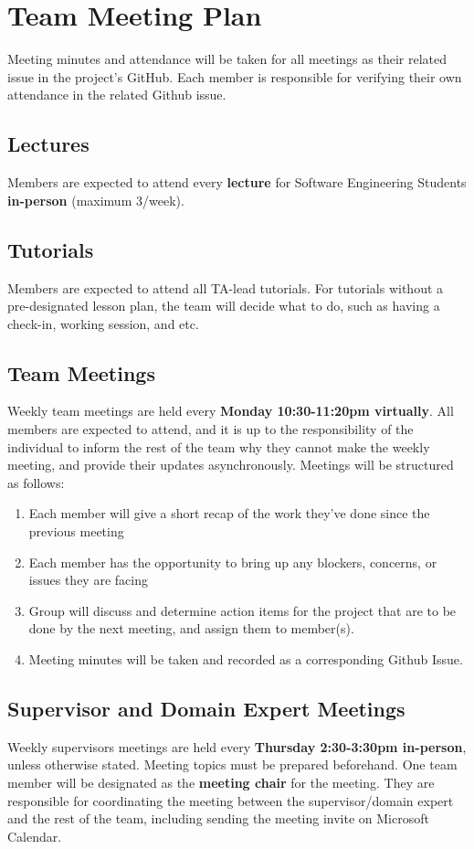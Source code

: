 \documentclass{article}
\begin{document}
\section{Team Meeting Plan}
Meeting minutes and attendance will be taken for all meetings as their related issue in the project's GitHub. Each member is responsible for verifying their own attendance in the related Github issue.
\subsection{Lectures}
  Members are expected to attend every \textbf{lecture} for Software Engineering Students \textbf{in-person} (maximum 3/week).
\subsection{Tutorials}
  Members are expected to attend all TA-lead tutorials. For tutorials without a pre-designated lesson plan, the team will decide what to do, such as having a check-in, working session, and etc.
\subsection{Team Meetings}
  Weekly team meetings are held every \textbf{Monday 10:30-11:20pm virtually}.
  All members are expected to attend, and it is up to the responsibility of the individual to inform the rest of the team why they cannot make the weekly meeting, and provide their updates asynchronously.
  Meetings will be structured as follows:
  \begin{enumerate}
    \item Each member will give a short recap of the work they've done since the previous meeting
    \item Each member has the opportunity to bring up any blockers, concerns, or issues they are facing
    \item Group will discuss and determine action items for the project that are to be done by the next meeting, and assign them to member(s).
    \item Meeting minutes will be taken and recorded as a corresponding Github Issue.
  \end{enumerate}
\subsection{Supervisor and Domain Expert Meetings}
  Weekly supervisors meetings are held every \textbf{Thursday 2:30-3:30pm in-person}, unless otherwise stated.
  Meeting topics must be prepared beforehand. One team member will be designated as the \textbf{meeting chair} for the meeting.
  They are responsible for coordinating the meeting between the supervisor/domain expert and the rest of the team, including sending the meeting invite on Microsoft Calendar.
\end{document}
